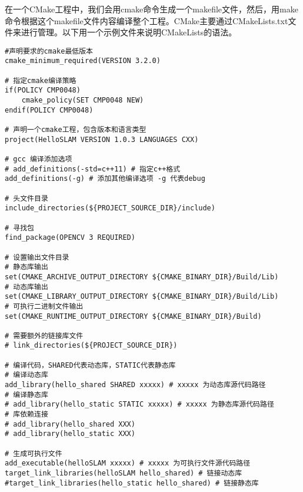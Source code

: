 在一个CMake工程中，我们会用cmake命令生成一个makefile文件，然后，用make命令根据这个makefile文件内容编译整个工程。CMake主要通过CMakeLists.txt文件来进行管理。以下用一个示例文件来说明CMakeLists的语法。
\begin{lstlisting}[style=bash]
#声明要求的cmake最低版本
cmake_minimum_required(VERSION 3.2.0)

# 指定cmake编译策略
if(POLICY CMP0048)
    cmake_policy(SET CMP0048 NEW)
endif(POLICY CMP0048)

# 声明一个cmake工程，包含版本和语言类型
project(HelloSLAM VERSION 1.0.3 LANGUAGES CXX)

# gcc 编译添加选项
# add_definitions(-std=c++11) # 指定c++格式
add_definitions(-g) # 添加其他编译选项 -g 代表debug

# 头文件目录
include_directories(${PROJECT_SOURCE_DIR}/include)

# 寻找包
find_package(OPENCV 3 REQUIRED)

# 设置输出文件目录
# 静态库输出
set(CMAKE_ARCHIVE_OUTPUT_DIRECTORY ${CMAKE_BINARY_DIR}/Build/Lib)
# 动态库输出
set(CMAKE_LIBRARY_OUTPUT_DIRECTORY ${CMAKE_BINARY_DIR}/Build/Lib)
# 可执行二进制文件输出
set(CMAKE_RUNTIME_OUTPUT_DIRECTORY ${CMAKE_BINARY_DIR}/Build)

# 需要额外的链接库文件
# link_directories(${PROJECT_SOURCE_DIR})

# 编译代码，SHARED代表动态库，STATIC代表静态库
# 编译动态库
add_library(hello_shared SHARED xxxxx) # xxxxx 为动态库源代码路径
# 编译静态库
# add_library(hello_static STATIC xxxxx) # xxxxx 为静态库源代码路径
# 库依赖连接
# add_library(hello_shared XXX)
# add_library(hello_static XXX)

# 生成可执行文件
add_executable(helloSLAM xxxxx) # xxxxx 为可执行文件源代码路径
target_link_libraries(helloSLAM hello_shared) # 链接动态库
#target_link_libraries(hello_static hello_shared) # 链接静态库
\end{lstlisting}
